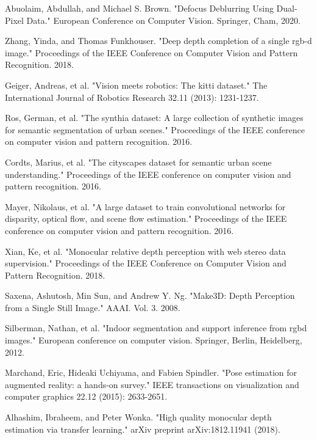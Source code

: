 \documentclass{article}
\begin{document}
\begin{thebibliography}{10}
 Abuolaim, Abdullah, and Michael S. Brown. "Defocus Deblurring Using Dual-Pixel Data." European Conference on Computer Vision. Springer, Cham, 2020.

 Zhang, Yinda, and Thomas Funkhouser. "Deep depth completion of a single rgb-d image." Proceedings of the IEEE Conference on Computer Vision and Pattern Recognition. 2018.

 Geiger, Andreas, et al. "Vision meets robotics: The kitti dataset." The International Journal of Robotics Research 32.11 (2013): 1231-1237.

 Ros, German, et al. "The synthia dataset: A large collection of synthetic images for semantic segmentation of urban scenes." Proceedings of the IEEE conference on computer vision and pattern recognition. 2016.

 Cordts, Marius, et al. "The cityscapes dataset for semantic urban scene understanding." Proceedings of the IEEE conference on computer vision and pattern recognition. 2016.

 Mayer, Nikolaus, et al. "A large dataset to train convolutional networks for disparity, optical flow, and scene flow estimation." Proceedings of the IEEE conference on computer vision and pattern recognition. 2016.

 Xian, Ke, et al. "Monocular relative depth perception with web stereo data supervision." Proceedings of the IEEE Conference on Computer Vision and Pattern Recognition. 2018.

 Saxena, Ashutosh, Min Sun, and Andrew Y. Ng. "Make3D: Depth Perception from a Single Still Image." AAAI. Vol. 3. 2008.

 Silberman, Nathan, et al. "Indoor segmentation and support inference from rgbd images." European conference on computer vision. Springer, Berlin, Heidelberg, 2012.

 Marchand, Eric, Hideaki Uchiyama, and Fabien Spindler. "Pose estimation for augmented reality: a hands-on survey." IEEE transactions on visualization and computer graphics 22.12 (2015): 2633-2651.

 Alhashim, Ibraheem, and Peter Wonka. "High quality monocular depth estimation via transfer learning." arXiv preprint arXiv:1812.11941 (2018).


\end{thebibliography}
\end{document}
